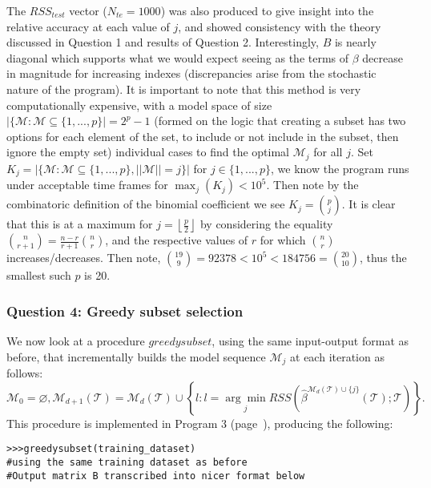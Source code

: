 \documentclass{article}
\begin{document}
The $RSS_{test}$ vector ($N_{te}=1000$) was also produced  to give insight into the relative accuracy at each value of $j$, and showed consistency with the theory discussed in Question 1 and results of Question 2. Interestingly, $B$ is nearly diagonal which supports what we would expect seeing as the terms of $\beta$ decrease in magnitude for increasing indexes (discrepancies arise from the stochastic nature of the program). It is important to note that this method is very computationally expensive, with a model space of size $|\{\mathcal{M}:\mathcal{M} \subseteq \{1,...,p\}|=2^p-1$ (formed on the logic that creating a subset has two options for each element of the set, to include or not include in the subset, then ignore the empty set) individual cases to find the optimal $\mathcal{M}_j$ for all $j$. Set $K_j=|\{\mathcal{M}:\mathcal{M} \subseteq \{1,...,p\}, ||\mathcal{M}|| =j\}|$ for $j \in \{1,...,p\}$, we know the program runs under acceptable time frames for $\max_j (K_j)<10^5$. Then note by the combinatoric definition of the binomial coefficient we see $K_j = {p \choose j}$. It is clear that this is at a maximum for $j = \left \lfloor \frac{p}{2} \right \rfloor$ by considering the equality ${n\choose r+1}=\frac{n-r}{r+1} {n\choose r}$, and the respective values of $r$ for which $n\choose r$ increases/decreases. Then note, ${19\choose 9}=92378 < 10^5 < 184756 = {20\choose 10}$, thus the smallest such $p$ is 20.

\subsubsection{Question 4: Greedy subset selection}

We now look at a procedure $\textit{greedysubset}$, using the same input-output format as before, that incrementally builds the model sequence $\mathcal{M}_j$ at each iteration as follows:
\begin{equation*}
\mathcal{M}_0 = \varnothing , \mathcal{M}_{d+1}(\mathcal{T}) = \mathcal{M}_d (\mathcal{T}) \cup \left \{ l : l= \underset{j}{\arg \min} RSS \left (\hat{\beta}^{\mathcal{M}_d(\mathcal{T}) \cup \{ j \} } (\mathcal{T});\mathcal{T} \right) \right \}.
\end{equation*}
This procedure is implemented in Program 3 (page~\pageref{subsec:Program 3}), producing the following:

\begin{lstlisting}
>>>greedysubset(training_dataset) 
#using the same training dataset as before
#Output matrix B transcribed into nicer format below
\end{lstlisting}
\end{document}
